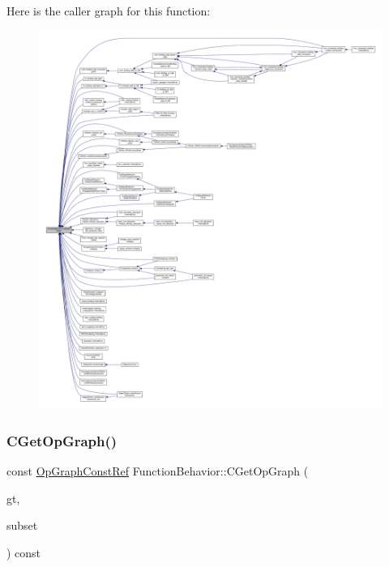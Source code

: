 Here is the caller graph for this function\+:
\nopagebreak
\begin{figure}[H]
\begin{center}
\leavevmode
\includegraphics[width=350pt]{d9/d45/classFunctionBehavior_a7c34fbc612df1b924d3b0c02fd71970b_icgraph}
\end{center}
\end{figure}
\mbox{\label{classFunctionBehavior_aefb995eb2c159bb42ece11bd62c09852}} 
\subsubsection{\texorpdfstring{C\+Get\+Op\+Graph()}{CGetOpGraph()}\hspace{0.1cm}{\footnotesize\ttfamily [2/2]}}
{\footnotesize\ttfamily const \hyperlink{op__graph_8hpp_a9a0b240622c47584bee6951a6f5de746}{Op\+Graph\+Const\+Ref} Function\+Behavior\+::\+C\+Get\+Op\+Graph (\begin{DoxyParamCaption}\item[{\hyperlink{classFunctionBehavior_aed344711ee2798586d99f537b4b7975c}{Function\+Behavior\+::graph\+\_\+type}}]{gt,  }\item[{const \hyperlink{classOpVertexSet}{Op\+Vertex\+Set} \&}]{subset }\end{DoxyParamCaption}) const}



